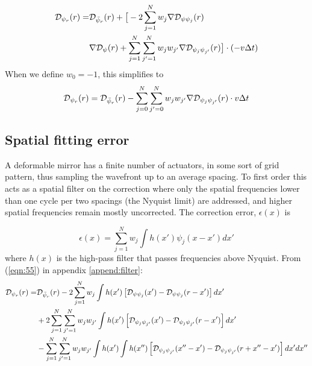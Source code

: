 \documentclass[11pt, oneside]{article}   	%
\begin{document}
\begin{align}
{\cal D}_{\psi_r}(r) = &{\cal D}_{\bar \psi_r}(r) + \big[ - 2 \sum_{j=1}^N w_j \nabla {\cal D}_{\psi\psi_j}(r) \nonumber \\
                                & \nabla{\cal D}_\psi (r) + \sum_{j=1}^N \sum_{j'=1}^N w_j w_{j'} \nabla {\cal D}_{\psi_j \psi_{j'}} (r) \big]\cdot (-v \Delta t)
\end{align}
When we define $w_0 = -1$, this simplifies to
\begin{equation}
{\cal D}_{\psi_r}(r) = {\cal D}_{\bar \psi_r}(r) - \sum_{j=0}^N \sum_{j'=0}^N w_j w_{j'} \nabla {\cal D}_{\psi_j \psi_{j'}} (r)\cdot v \Delta t
\end{equation}

\subsection{Spatial fitting error}

A deformable mirror has a finite number of actuators, in some sort of grid pattern, thus sampling the wavefront up to  an average spacing. To first order this acts as a spatial filter on the correction where only the spatial frequencies lower than one cycle per two spacings (the Nyquist limit) are addressed, and higher spatial frequencies remain mostly uncorrected. The correction error, $\epsilon(x)$ is

\begin{equation}
\epsilon(x) = \sum_{j=1}^N w_j \int h(x')  \psi_j(x-x') dx'
\end{equation}
where $h(x)$ is the high-pass filter that passes frequencies above Nyquist. From (\ref{eqn:55}) in appendix \ref{append:filter}:
\begin{align}
{\cal D}_{\psi_r}(r) = &{\cal D}_{\bar \psi_r}(r) 
   - 2\sum_{j=1}^N                        w_j          \int h(x')                \left[ {\cal D}_{\psi    \psi_j   }(x')      - {\cal D}_{\psi \psi_j      } (r-x')           \right ] dx' \nonumber \\
& + 2\sum_{j=1}^N \sum_{j'=1}^N w_j w_{j'} \int h(x')                \left[ {\cal D}_{\psi_j \psi_{j'}}(x')      - {\cal D}_{\psi_j \psi_{j'}} (r-x')            \right] dx' \nonumber \\
& - \sum_{j=1}^N \sum_{j'=1}^N w_j w_{j'} \int h(x') \int h(x'') \left[ {\cal D}_{\psi_j \psi_{j'}} (x''-x') - {\cal D}_{\psi_j \psi_{j'}} ( r + x'' - x') \right] dx' dx''
\end{align} 
\end{document}
